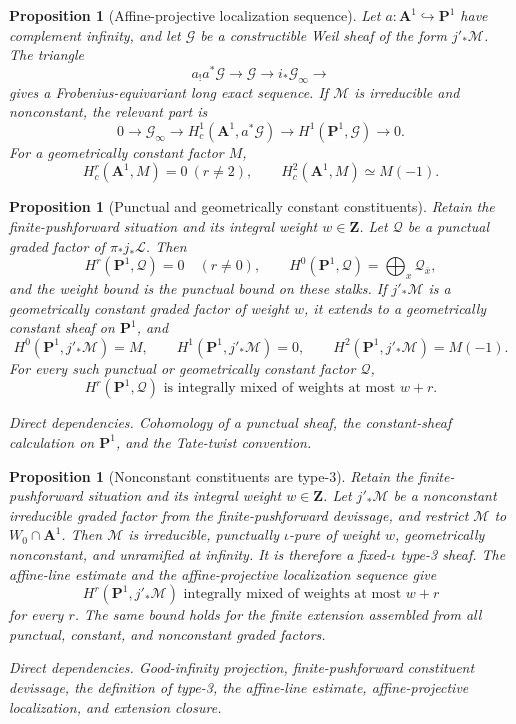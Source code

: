 \documentclass[10pt]{article}
\newtheorem{proposition}[theorem]{Proposition}
\theoremstyle{definition}
\newcommand{\dep}[1]{\par\smallskip\noindent\textit{Direct dependencies.} #1\par}
\begin{document}
\begin{proposition}[Affine-projective localization sequence]
Let \(a:\mathbf A^1\hookrightarrow\mathbf P^1\) have complement infinity,
and let \(\mathcal G\) be a constructible Weil sheaf of the form
\(j'_*\mathcal M\).  The triangle
\[
 a_!a^*\mathcal G\longrightarrow\mathcal G
 \longrightarrow i_*\mathcal G_\infty\longrightarrow
\]
gives a Frobenius-equivariant long exact sequence.  If \(\mathcal M\) is
irreducible and nonconstant, the relevant part is
\[
 0\longrightarrow\mathcal G_\infty
 \longrightarrow H_c^1(\mathbf A^1,a^*\mathcal G)
 \longrightarrow H^1(\mathbf P^1,\mathcal G)\longrightarrow0.
\]
For a geometrically constant factor \(M\),
\[
 H_c^r(\mathbf A^1,M)=0\ (r\ne2),\qquad
 H_c^2(\mathbf A^1,M)\simeq M(-1).
\]
\end{proposition}

\begin{proposition}[Punctual and geometrically constant constituents]
Retain the finite-pushforward situation and its integral weight
\(w\in\mathbf Z\).  Let \(\mathcal Q\) be a punctual graded factor of
\(\pi_*j_*\mathcal L\).  Then
\[
 H^r(\mathbf P^1,\mathcal Q)=0\quad(r\ne0),\qquad
 H^0(\mathbf P^1,\mathcal Q)=\bigoplus_x\mathcal Q_{\bar x},
\]
and the weight bound is the punctual bound on these stalks.  If
\(j'_*\mathcal M\) is a geometrically constant graded factor of weight
\(w\), it extends to a geometrically constant sheaf on \(\mathbf P^1\), and
\[
 H^0(\mathbf P^1,j'_*\mathcal M)=M,\qquad
 H^1(\mathbf P^1,j'_*\mathcal M)=0,\qquad
 H^2(\mathbf P^1,j'_*\mathcal M)=M(-1).
\]
For every such punctual or geometrically constant factor \(\mathcal Q\),
\[
 H^r(\mathbf P^1,\mathcal Q)
 \text{ is integrally mixed of weights at most }w+r.
\]
\dep{Cohomology of a punctual sheaf, the constant-sheaf calculation on
\(\mathbf P^1\), and the Tate-twist convention.}
\end{proposition}

\begin{proposition}[Nonconstant constituents are type-3]
Retain the finite-pushforward situation and its integral weight
\(w\in\mathbf Z\).  Let \(j'_*\mathcal M\) be a nonconstant irreducible
graded factor from the
finite-pushforward devissage, and restrict \(\mathcal M\) to
\(W_0\cap\mathbf A^1\).  Then \(\mathcal M\) is irreducible, punctually \(\iota\)-pure
of weight \(w\), geometrically nonconstant, and unramified at infinity.
It is therefore a fixed-\(\iota\) type-3 sheaf.  The affine-line estimate and the
affine-projective localization sequence give
\[
 H^r(\mathbf P^1,j'_*\mathcal M)
 \text{ integrally mixed of weights at most }w+r
\]
for every \(r\).  The same bound holds for the finite extension assembled
from all punctual, constant, and nonconstant graded factors.
\dep{Good-infinity projection, finite-pushforward constituent devissage,
the definition of type-3, the affine-line estimate, affine-projective
localization, and extension closure.}
\end{proposition}
\end{document}
